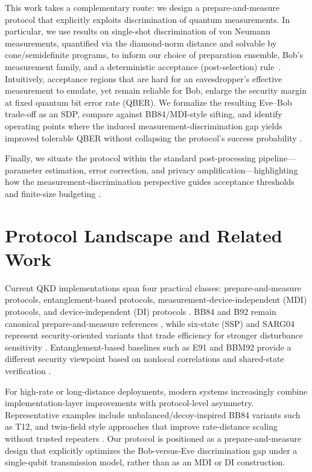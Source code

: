 \documentclass[a4paper,twocolumn,11pt,unpublished]{quantumarticle}
\begin{document}
This work takes a complementary route: we design a prepare-and-measure protocol
that explicitly exploits discrimination of quantum measurements. In particular,
we use results on single-shot discrimination of von Neumann measurements,
quantified via the diamond-norm distance and solvable by cone/semidefinite
programs, to inform our choice of preparation ensemble, Bob’s measurement
family, and a deterministic acceptance (post-selection)
rule~\cite{Puchala2018VNM}. Intuitively, acceptance regions that are hard for an
eavesdropper’s effective measurement to emulate, yet remain reliable for Bob,
enlarge the security margin at fixed quantum bit error rate (QBER). We formalize
the resulting Eve–Bob trade-off as an SDP, compare against BB84/MDI-style
sifting, and identify operating points where the induced
measurement-discrimination gap yields improved tolerable QBER without collapsing
the protocol’s success probability \cite{BB84,LoCurtyQi2012,Puchala2018VNM}.

Finally, we situate the protocol within the standard post-processing
pipeline—parameter estimation, error correction, and privacy
amplification—highlighting how the measurement-discrimination perspective
guides acceptance thresholds and finite-size budgeting
\cite{ScaraniRMP2009,XuRMP2020}.

\section{Protocol Landscape and Related Work}
Current QKD implementations span four practical classes: prepare-and-measure
protocols, entanglement-based protocols, measurement-device-independent (MDI)
protocols, and device-independent (DI) protocols
\cite{lo2014secure,XuRMP2020,LoCurtyQi2012,DIQKDReview2023}. BB84 and B92 remain
canonical prepare-and-measure references \cite{BB84,B92}, while six-state (SSP)
and SARG04 represent security-oriented variants that trade efficiency for
stronger disturbance sensitivity \cite{SSP,SARG04}. Entanglement-based baselines
such as E91 and BBM92 provide a different security viewpoint based on nonlocal
correlations and shared-state verification \cite{ekert1991quantum,B92ent}.

For high-rate or long-distance deployments, modern systems increasingly combine
implementation-layer improvements with protocol-level asymmetry. Representative
examples include unbalanced/decoy-inspired BB84 variants such as T12, and
twin-field style approaches that improve rate-distance scaling without trusted
repeaters \cite{T12,rate_distance}. Our protocol is positioned as a
prepare-and-measure design that explicitly optimizes the Bob-versus-Eve
discrimination gap under a single-qubit transmission model, rather than as an
MDI or DI construction.
\end{document}

